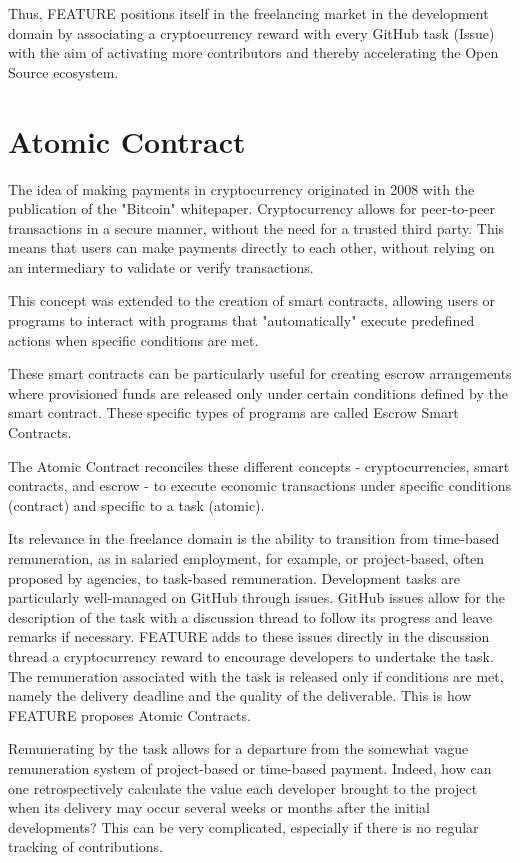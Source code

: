 \documentclass[
	a4paper, %
	10pt, %
	unnumberedsections, %
	twoside, %
]{LTJournalArticle}
\begin{document}
Thus, FEATURE positions itself in the freelancing market in the development domain by associating a cryptocurrency reward with every GitHub task (Issue) with the aim of activating more contributors and thereby accelerating the Open Source ecosystem.


\section{Atomic Contract}

The idea of making payments in cryptocurrency originated in 2008 with the publication of the "Bitcoin" whitepaper. Cryptocurrency allows for peer-to-peer transactions in a secure manner, without the need for a trusted third party. This means that users can make payments directly to each other, without relying on an intermediary to validate or verify transactions.

This concept was extended to the creation of smart contracts, allowing users or programs to interact with programs that "automatically" execute predefined actions when specific conditions are met.

These smart contracts can be particularly useful for creating escrow arrangements where provisioned funds are released only under certain conditions defined by the smart contract. These specific types of programs are called Escrow Smart Contracts.

The Atomic Contract reconciles these different concepts - cryptocurrencies, smart contracts, and escrow - to execute economic transactions under specific conditions (contract) and specific to a task (atomic).

Its relevance in the freelance domain is the ability to transition from time-based remuneration, as in salaried employment, for example, or project-based, often proposed by agencies, to task-based remuneration. Development tasks are particularly well-managed on GitHub through issues. GitHub issues allow for the description of the task with a discussion thread to follow its progress and leave remarks if necessary. FEATURE adds to these issues directly in the discussion thread a cryptocurrency reward to encourage developers to undertake the task. The remuneration associated with the task is released only if conditions are met, namely the delivery deadline and the quality of the deliverable. This is how FEATURE proposes Atomic Contracts.

Remunerating by the task allows for a departure from the somewhat vague remuneration system of project-based or time-based payment. Indeed, how can one retrospectively calculate the value each developer brought to the project when its delivery may occur several weeks or months after the initial developments? This can be very complicated, especially if there is no regular tracking of contributions.
\end{document}
